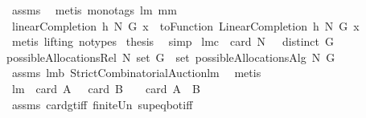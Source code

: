 \begin{isabellebody}
\ assms\ \isamarkupfalse%
\ {\isacharparenleft}metis\ {\isacharparenleft}mono{\isacharunderscore}tags{\isacharparenright}\ lm{}{}\ mm{}{}{\isacharparenright}\isanewline
{}\isamarkupfalse%
\ \isamarkupfalse%
\ {\isachardoublequoteopen}linearCompletion\ {\isacharquery}h{}\ N\ G\ x\ {\isacharequal}\ {\isacharparenleft}toFunction\ {\isacharparenleft}LinearCompletion\ {\isacharquery}h{}\ N\ G{\isacharparenright}{\isacharparenright}\ x{\isachardoublequoteclose}\ \isanewline
{}\isamarkupfalse%
\ {\isacharparenleft}metis\ {\isacharparenleft}lifting{\isacharcomma}\ no{\isacharunderscore}types{\isacharparenright}{\isacharparenright}\isanewline
{}\isamarkupfalse%
\ {\isacharquery}thesis\ \isamarkupfalse%
\ simp\isanewline
{}\isamarkupfalse%
%
\endisatagproof
{\isafoldproof}%
%
\isadelimproof
\isanewline
%
\endisadelimproof
\isanewline
{}\isamarkupfalse%
\ lm{}{}c{\isacharcolon}\ \ {\isachardoublequoteopen}card\ N\ {\isachargreater}\ {}{\isachardoublequoteclose}\ {\isachardoublequoteopen}distinct\ G{\isachardoublequoteclose}\ \ \isanewline
{\isachardoublequoteopen}possibleAllocationsRel\ N\ {\isacharparenleft}set\ G{\isacharparenright}\ {\isacharequal}\ set\ {\isacharparenleft}possibleAllocationsAlg{}\ N\ G{\isacharparenright}{\isachardoublequoteclose}\ \ \isanewline
%
\isadelimproof
%
\endisadelimproof
%
\isatagproof
{}\isamarkupfalse%
\ assms\ lm{}{}b\ StrictCombinatorialAuction{\isachardot}lm{}{}\ \isamarkupfalse%
\ metis%
\endisatagproof
{\isafoldproof}%
%
\isadelimproof
\isanewline
%
\endisadelimproof
\isanewline
{}\isamarkupfalse%
\ lm{}{}{\isacharcolon}\ \ {\isachardoublequoteopen}card\ A\ {\isachargreater}\ {}{\isachardoublequoteclose}\ {\isachardoublequoteopen}card\ B\ {\isachargreater}\ {}{\isachardoublequoteclose}\ \ {\isachardoublequoteopen}card\ {\isacharparenleft}A\ {\isasymunion}\ B{\isacharparenright}\ {\isachargreater}\ {}{\isachardoublequoteclose}\ \isanewline
%
\isadelimproof
%
\endisadelimproof
%
\isatagproof
{}\isamarkupfalse%
\ assms\ card{\isacharunderscore}gt{\isacharunderscore}{}{\isacharunderscore}iff\ finite{\isacharunderscore}Un\ sup{\isacharunderscore}eq{\isacharunderscore}bot{\isacharunderscore}iff\ \isamarkupfalse%

\end{isabellebody}
